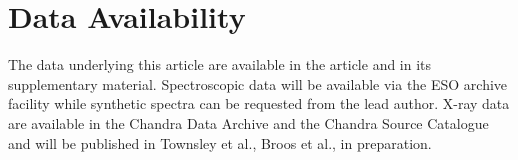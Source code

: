 \documentclass[fleqn,usenatbib]{mnras}
\begin{document}
\section*{Data Availability}
The data underlying this article are available in the article and in its supplementary material. Spectroscopic data will be available via the ESO archive facility while synthetic spectra can be requested from the lead author. X-ray data are available in the Chandra Data Archive and the Chandra Source Catalogue and will be published in Townsley et al., Broos et al., in preparation.
 












\appendix
\end{document}
